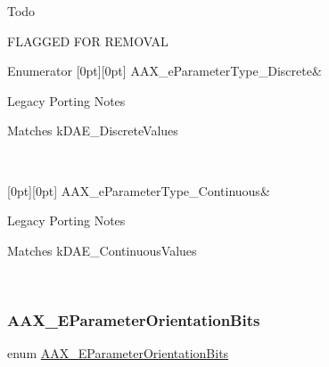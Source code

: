 \begin{DoxyRefDesc}{Todo}
\item[\mbox{\hyperlink{a00785__todo000028}{Todo}}]F\+L\+A\+G\+G\+ED F\+OR R\+E\+M\+O\+V\+AL\end{DoxyRefDesc}
\begin{DoxyEnumFields}{Enumerator}
[0pt][0pt]{}\mbox{\label{a00491_a4cd0f189daa9a60cf36883c56344bb2ea2a3c9939ef1fa8b8f729152c35c42740}} 
A\+A\+X\+\_\+e\+Parameter\+Type\+\_\+\+Discrete&\begin{DoxyRefDesc}{Legacy Porting Notes}
\item[\mbox{\hyperlink{a00787__porting_notes000022}{Legacy Porting Notes}}]Matches {\ttfamily k\+D\+A\+E\+\_\+\+Discrete\+Values} \end{DoxyRefDesc}
\\
\hline

[0pt][0pt]{}\mbox{\label{a00491_a4cd0f189daa9a60cf36883c56344bb2eade82e7d1b5012a76837b70c1a9b92168}} 
A\+A\+X\+\_\+e\+Parameter\+Type\+\_\+\+Continuous&\begin{DoxyRefDesc}{Legacy Porting Notes}
\item[\mbox{\hyperlink{a00787__porting_notes000023}{Legacy Porting Notes}}]Matches {\ttfamily k\+D\+A\+E\+\_\+\+Continuous\+Values} \end{DoxyRefDesc}
\\
\hline

\end{DoxyEnumFields}
\mbox{\label{a00491_aa5ffa1ed828630b6b7a13c049d93ae87}} 
\subsubsection{\texorpdfstring{AAX\_EParameterOrientationBits}{AAX\_EParameterOrientationBits}}
{\footnotesize\ttfamily enum \mbox{\hyperlink{a00491_aa5ffa1ed828630b6b7a13c049d93ae87}{A\+A\+X\+\_\+\+E\+Parameter\+Orientation\+Bits}}}



